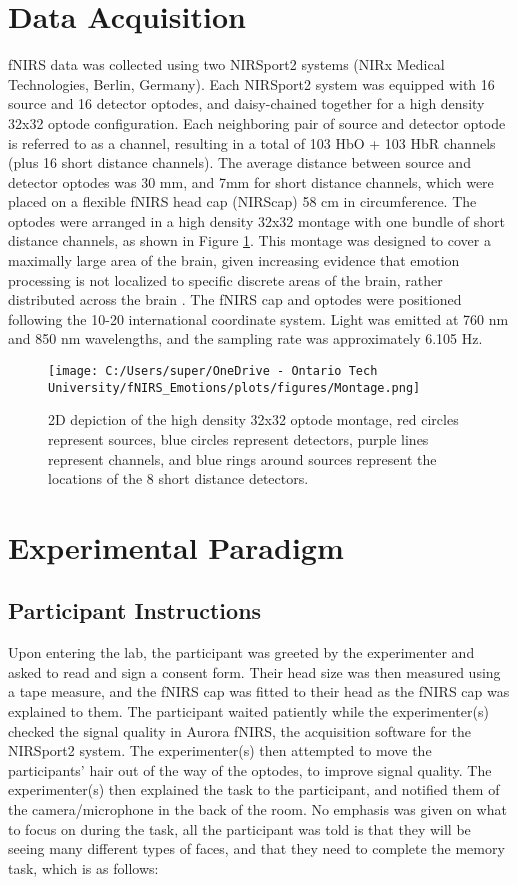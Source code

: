 \section{Data Acquisition}
fNIRS data was collected using two NIRSport2 systems (NIRx Medical Technologies, Berlin, Germany). 
Each NIRSport2 system was equipped with 16 source and 16 detector optodes, and daisy-chained together for a high density 32x32 optode configuration. 
Each neighboring pair of source and detector optode is referred to as a channel, resulting in a total of 103 HbO + 103 HbR channels (plus 16 short distance channels).
The average distance between source and detector optodes was 30 mm, and 7mm for short distance channels, which were placed on a flexible fNIRS head cap (NIRScap) 58 cm in circumference. 
The optodes were arranged in a high density 32x32 montage with one bundle of short distance channels, as shown in Figure \ref{fig:montage}. 
This montage was designed to cover a maximally large area of the brain, given increasing evidence that emotion processing is not localized to specific discrete areas of the brain, rather distributed across the brain \citep{lindquist_brain_2012}. 
The fNIRS cap and optodes were positioned following the 10-20 international coordinate system.
Light was emitted at 760 nm and 850 nm wavelengths, and the sampling rate was approximately 6.105 Hz.

\begin{figure}[H]
    \centering
    \texttt{[image: C:/Users/super/OneDrive - Ontario Tech University/fNIRS\_Emotions/plots/figures/Montage.png]}
    \caption{2D depiction of the high density 32x32 optode montage, red circles represent sources, blue circles
    represent detectors, purple lines represent channels, and blue rings around sources represent the locations of the 8 short distance detectors. }
    \label{fig:montage}
\end{figure}

\section{Experimental Paradigm}
\subsection{Participant Instructions}
Upon entering the lab, the participant was greeted by the experimenter and asked to read and sign a consent form. 
Their head size was then measured using a tape measure, and the fNIRS cap was fitted to their head as the fNIRS cap was explained to them.
The participant waited patiently while the experimenter(s) checked the signal quality in Aurora fNIRS, the acquisition software for the NIRSport2 system.
The experimenter(s) then attempted to move the participants' hair out of the way of the optodes, to improve signal quality.
The experimenter(s) then explained the task to the participant, and notified them of the camera/microphone in the back of the room. 
No emphasis was given on what to focus on during the task, all the participant was told is that they will be seeing many different types of faces, and that they need to complete the memory task, which is as follows:

